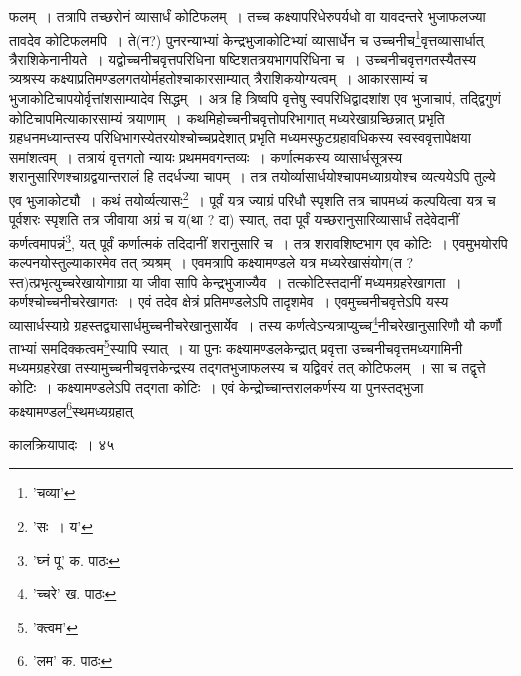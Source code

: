 \documentclass[11pt, openany]{book}
\begin{document}
{{{{{\vspace{0.3cm}
\noindent फलम्~। तत्रापि तच्छरोनं व्यासार्धं कोटिफलम्~। तच्च कक्ष्यापरिधेरुपर्यधो वा यावदन्तरे भुजाफलज्या तावदेव कोटिफलमपि~। ते(न?) पुनरन्याभ्यां केन्द्रभुजाकोटिभ्यां व्यासार्धेन च उच्चनीच\renewcommand{\thefootnote}{१}\footnote{'चव्या'}वृत्तव्यासार्धात् त्रैराशिकेनानीयते~। यद्वोच्चनीचवृत्तपरिधिना षष्टिशतत्रयभागपरिधिना च~। उच्चनीचवृत्तगतस्यैतस्य त्र्यश्रस्य
कक्ष्याप्रतिमण्डलगतयोर्महतोश्चाकारसाम्यात् त्रैराशिकयोग्यत्वम्~। आकारसाम्यं च भुजाकोटिचापयोर्वृत्तांशसाम्यादेव सिद्धम्~। अत्र हि त्रिष्वपि वृत्तेषु स्वपरिधिद्वादशांश एव भुजाचापं, तद्द्विगुणं कोटिचापमित्याकारसाम्यं त्रयाणाम्~। कथमिहोच्चनीचवृत्तोपरिभागात् मध्यरेखाग्रच्छिन्नात् प्रभृति ग्रहधनमध्यान्तस्य परिधिभागस्येतरयोश्चोच्चप्रदेशात् प्रभृति मध्यमस्फुटग्रहावधिकस्य स्वस्ववृत्तापेक्षया समांशत्वम्~। तत्रायं वृत्तगतो न्यायः प्रथममवगन्तव्यः~। कर्णात्मकस्य व्यासार्धसूत्रस्य शरानुसारिणश्चाग्रद्वयान्तरालं हि तदर्धज्या चापम्~। तत्र तयोर्व्यासार्धयोश्चापमध्याग्रयोश्च व्यत्ययेऽपि तुल्ये एव भुजाकोट्यौ~। कथं तयोर्व्यत्यासः\renewcommand{\thefootnote}{२}\footnote{'सः~। य'}~। पूर्वं यत्र ज्याग्रं परिधौ स्पृशति तत्र चापमध्यं कल्पयित्वा यत्र च पूर्वशरः स्पृशति तत्र जीवाया अग्रं च य(था ? दा) स्यात्, तदा पूर्वं यच्छरानुसारिव्यासार्धं तदेवेदानीं कर्णत्वमापन्नं\renewcommand{\thefootnote}{३}\footnote{'घ्नं पू' क. पाठः}, यत् पूर्वं कर्णात्मकं तदिदानीं शरानुसारि च~। तत्र शरावशिष्टभाग एव कोटिः~। एवमुभयोरपि कल्पनयोस्तुल्याकारमेव तत् त्र्यश्रम्~। एवमत्रापि कक्ष्यामण्डले यत्र मध्यरेखासंयोग(त ? स्त)त्प्रभृत्युच्चरेखायोगाग्रा या जीवा सापि केन्द्रभुजाज्यैव~। तत्कोटिस्तदानीं मध्यमग्रहरेखागता~। कर्णश्चोच्चनीचरेखागतः~। एवं तदेव क्षेत्रं प्रतिमण्डलेऽपि तादृशमेव~। एवमुच्चनीचवृत्तेऽपि यस्य व्यासार्धस्याग्रे
ग्रहस्तद्व्यासार्धमुच्चनीचरेखानुसार्येव~। तस्य कर्णत्वेऽन्यत्राप्युच्च\renewcommand{\thefootnote}{४}\footnote{'च्चरे' ख. पाठः}नीचरेखानुसारिणौ यौ कर्णौ ताभ्यां समदिक्कत्वम\renewcommand{\thefootnote}{५}\footnote{'क्त्वम'}स्यापि स्यात्~। या पुनः कक्ष्यामण्डलकेन्द्रात् प्रवृत्ता उच्चनीचवृत्तमध्यगामिनी मध्यमग्रहरेखा तस्यामुच्चनीचवृत्तकेन्द्रस्य तद्गतभुजाफलस्य च यद्विवरं तत् कोटिफलम्~। सा च तद्वृत्ते कोटिः~। कक्ष्यामण्डलेऽपि तद्गता कोटिः~। एवं केन्द्रोच्चान्तरालकर्णस्य या पुनस्तद्भुजा
कक्ष्यामण्डल\renewcommand{\thefootnote}{६}\footnote{'लम' क. पाठः}स्थमध्यग्रहात्


\newpage

\vspace{3cm} \hspace{4cm}कालक्रियापादः~।\hspace{4cm} ४५

}}}}}
\end{document}
